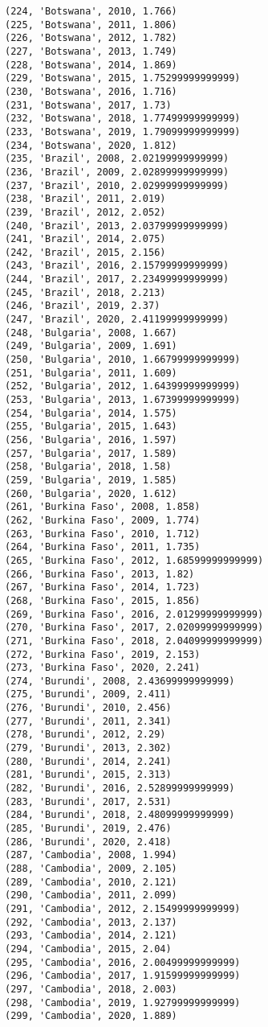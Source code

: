 \documentclass[11pt]{article}
\begin{document}
\begin{Verbatim}[commandchars=\\\{\}]
(224, 'Botswana', 2010, 1.766)
(225, 'Botswana', 2011, 1.806)
(226, 'Botswana', 2012, 1.782)
(227, 'Botswana', 2013, 1.749)
(228, 'Botswana', 2014, 1.869)
(229, 'Botswana', 2015, 1.75299999999999)
(230, 'Botswana', 2016, 1.716)
(231, 'Botswana', 2017, 1.73)
(232, 'Botswana', 2018, 1.77499999999999)
(233, 'Botswana', 2019, 1.79099999999999)
(234, 'Botswana', 2020, 1.812)
(235, 'Brazil', 2008, 2.02199999999999)
(236, 'Brazil', 2009, 2.02899999999999)
(237, 'Brazil', 2010, 2.02999999999999)
(238, 'Brazil', 2011, 2.019)
(239, 'Brazil', 2012, 2.052)
(240, 'Brazil', 2013, 2.03799999999999)
(241, 'Brazil', 2014, 2.075)
(242, 'Brazil', 2015, 2.156)
(243, 'Brazil', 2016, 2.15799999999999)
(244, 'Brazil', 2017, 2.23499999999999)
(245, 'Brazil', 2018, 2.213)
(246, 'Brazil', 2019, 2.37)
(247, 'Brazil', 2020, 2.41199999999999)
(248, 'Bulgaria', 2008, 1.667)
(249, 'Bulgaria', 2009, 1.691)
(250, 'Bulgaria', 2010, 1.66799999999999)
(251, 'Bulgaria', 2011, 1.609)
(252, 'Bulgaria', 2012, 1.64399999999999)
(253, 'Bulgaria', 2013, 1.67399999999999)
(254, 'Bulgaria', 2014, 1.575)
(255, 'Bulgaria', 2015, 1.643)
(256, 'Bulgaria', 2016, 1.597)
(257, 'Bulgaria', 2017, 1.589)
(258, 'Bulgaria', 2018, 1.58)
(259, 'Bulgaria', 2019, 1.585)
(260, 'Bulgaria', 2020, 1.612)
(261, 'Burkina Faso', 2008, 1.858)
(262, 'Burkina Faso', 2009, 1.774)
(263, 'Burkina Faso', 2010, 1.712)
(264, 'Burkina Faso', 2011, 1.735)
(265, 'Burkina Faso', 2012, 1.68599999999999)
(266, 'Burkina Faso', 2013, 1.82)
(267, 'Burkina Faso', 2014, 1.723)
(268, 'Burkina Faso', 2015, 1.856)
(269, 'Burkina Faso', 2016, 2.01299999999999)
(270, 'Burkina Faso', 2017, 2.02099999999999)
(271, 'Burkina Faso', 2018, 2.04099999999999)
(272, 'Burkina Faso', 2019, 2.153)
(273, 'Burkina Faso', 2020, 2.241)
(274, 'Burundi', 2008, 2.43699999999999)
(275, 'Burundi', 2009, 2.411)
(276, 'Burundi', 2010, 2.456)
(277, 'Burundi', 2011, 2.341)
(278, 'Burundi', 2012, 2.29)
(279, 'Burundi', 2013, 2.302)
(280, 'Burundi', 2014, 2.241)
(281, 'Burundi', 2015, 2.313)
(282, 'Burundi', 2016, 2.52899999999999)
(283, 'Burundi', 2017, 2.531)
(284, 'Burundi', 2018, 2.48099999999999)
(285, 'Burundi', 2019, 2.476)
(286, 'Burundi', 2020, 2.418)
(287, 'Cambodia', 2008, 1.994)
(288, 'Cambodia', 2009, 2.105)
(289, 'Cambodia', 2010, 2.121)
(290, 'Cambodia', 2011, 2.099)
(291, 'Cambodia', 2012, 2.15499999999999)
(292, 'Cambodia', 2013, 2.137)
(293, 'Cambodia', 2014, 2.121)
(294, 'Cambodia', 2015, 2.04)
(295, 'Cambodia', 2016, 2.00499999999999)
(296, 'Cambodia', 2017, 1.91599999999999)
(297, 'Cambodia', 2018, 2.003)
(298, 'Cambodia', 2019, 1.92799999999999)
(299, 'Cambodia', 2020, 1.889)

\end{Verbatim}
\end{document}
